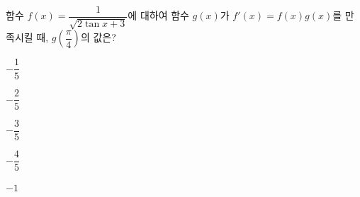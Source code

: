 함수 $f(x)=\dfrac{1}{\sqrt{2\tan x+3}}$에 대하여 함수 $g(x)$가 $f'(x)=f(x)g(x)$를 만족시킬 때, $g\left(\dfrac{\pi}{4}\right)$의 값은?
\begin{choices32}{\rule[-3ex]{0pt}{8ex}$-\dfrac{1}{5}$}{\rule[-3ex]{0pt}{8ex}$-\dfrac{2}{5}$}{\rule[-3ex]{0pt}{8ex}$-\dfrac{3}{5}$}{\rule[-3ex]{0pt}{8ex}$-\dfrac{4}{5}$}{\rule[-3ex]{0pt}{8ex}$-1$}\end{choices32}
